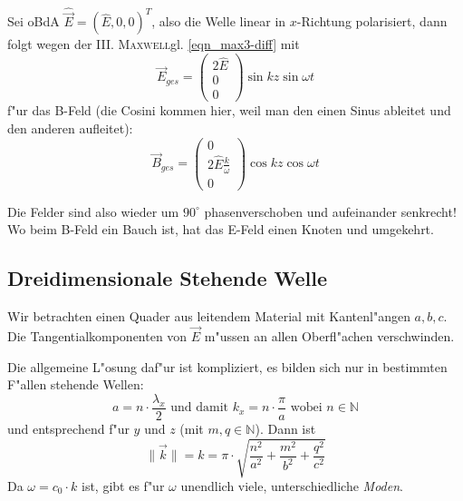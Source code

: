 Sei oBdA $\hat {\vec E} = (\hat E, 0, 0)^T$, also die Welle linear in
$x$-Richtung polarisiert, dann folgt wegen der
III. \textsc{Maxwell}gl. \eqref{eqn_max3-diff} mit
\begin{equation*}
   \vec E_{ges} =
   \begin{pmatrix}
      2\hat E\\0\\0
   \end{pmatrix} \sin kz \sin \omega t
\end{equation*}
f"ur das B-Feld (die Cosini kommen hier, weil  man den einen Sinus ableitet
und den anderen aufleitet):
\begin{equation*}
\vec B_{ges} =
\begin{pmatrix}
   0\\2 \hat E \frac{k}{\omega}\\0
\end{pmatrix} \cos kz \cos \omega t
\end{equation*}
\begin{Wichtig}
   Die Felder sind also wieder um $90^\circ$ phasenverschoben und
   aufeinander senkrecht! Wo beim B-Feld ein Bauch ist, hat das E-Feld
   einen Knoten und umgekehrt.
\end{Wichtig}






\subsection{Dreidimensionale Stehende Welle}
\label{kap_dreidimensionale-stehende-welle}

Wir betrachten einen Quader aus leitendem Material mit Kantenl"angen
$a, b, c$. Die Tangentialkomponenten von $\vec E$ m"ussen an allen
Oberfl"achen verschwinden.

Die allgemeine L"osung daf"ur ist kompliziert, es bilden sich nur in
bestimmten F"allen stehende Wellen:
\begin{equation}
   \label{eq:416}
   a = n \cdot \frac{\lambda_x}{2} \text{ und damit } k_x = n \cdot
   \frac{\pi}{a} \text{ wobei } n \in \mathbb N
\end{equation}
und entsprechend f"ur $y$ und $z$ (mit $m, q \in \mathbb N$). Dann ist
\begin{equation}
   \label{eq:417}
   \|\vec k\| = k= \pi \cdot \sqrt{
\frac{n^2}{a^2} + \frac{m^2}{b^2} + \frac{q^2}{c^2}
}
\end{equation}
Da $\omega = c_0 \cdot k$ ist, gibt es f"ur $\omega$ unendlich viele,
unterschiedliche \emph{Moden}.

